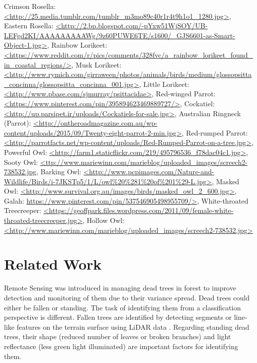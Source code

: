 \documentclass{subfiles}
\begin{document}
{{    	Crimson Rosella: \url{<http://25.media.tumblr.com/tumblr_m3mo89c40r1r4t9h1o1_1280.jpg>},
    	Eastern Rosella: \url{<http://2.bp.blogspot.com/-pYxw51WjSOY/UB-LEFgd2KI/AAAAAAAAAWg/9z60PUWE6TE/s1600/_GJS6601-as-Smart-Object-1.jpg>},
    	Rainbow Lorikeet: \url{<https://www.reddit.com/r/pics/comments/328fvc/a_rainbow_lorikeet_found_in_coastal_regions/>},     	Musk Lorikeet: \url{<http://www.rymich.com/girraween/photos/animals/birds/medium/glossopsitta_concinna/glossopsitta_concinna_001.jpg>},     	Little Lorikeet: \url{<http://www.pbase.com/sjmurray/psittacidae>},     	Red-winged Parrot: \url{<https://www.pinterest.com/pin/395894623469889727/>}, Cockatiel: \url{<http://up.parsipet.ir/uploads/Cockatiels-for-sale.jpg>},     	Australian Ringneck (Parrot): \url{<http://ontheroadmagazine.com.au/wp-content/uploads/2015/09/Twenty-eight-parrot-2-min.jpg>},     	Red-rumped Parrot: \url{<http://parrotfacts.net/wp-content/uploads/Red-Rumped-Parrot-on-a-tree.jpg>},     	Powerful Owl: \url{<http://farm1.staticflickr.com/219/495796536_f78dac04c1.jpg>},     	Sooty Owl: \url{<ttp://www.mariewinn.com/marieblog/uploaded_images/screech2-738532.jpg},     	Barking Owl: \url{<http://www.pcpimages.com/Nature-and-Wildlife/Birds/i-7JKSTp5/1/L/owl\%20\%281\%20of\%201\%29-L.jpg>},     	Masked Owl: \url{<http://www.survival.org.au/images/birds/masked_owl_2_600.jpg>},  	Galah: \url{https://www.pinterest.com/pin/537546905498955709/>},   	White-throated Treecreeper: \url{<https://geoffpark.files.wordpress.com/2011/09/female-white-throated-treecreeper.jpg>}, Hollow Owl: \url{<http://www.mariewinn.com/marieblog/uploaded_images/screech2-738532.jpg>} }
}





\section{Related Work}

\par Remote Sensing was introduced in managing dead trees in forest to improve detection and monitoring of them due to their variance spread. Dead trees could either be fallen or standing. The task of identifying them from a classification perspective is different. Fallen trees are identified by detecting segments or line-like features on the terrain surface using LiDAR data \cite{Polewski2015} \cite{Mucke2013}. Regarding standing dead trees, their shape (reduced number of leaves or broken branches) \cite{Yao2012} and light reflectance (less green light illuminated) \cite{Pasher2009} are important factors for identifying them.
\end{document}
